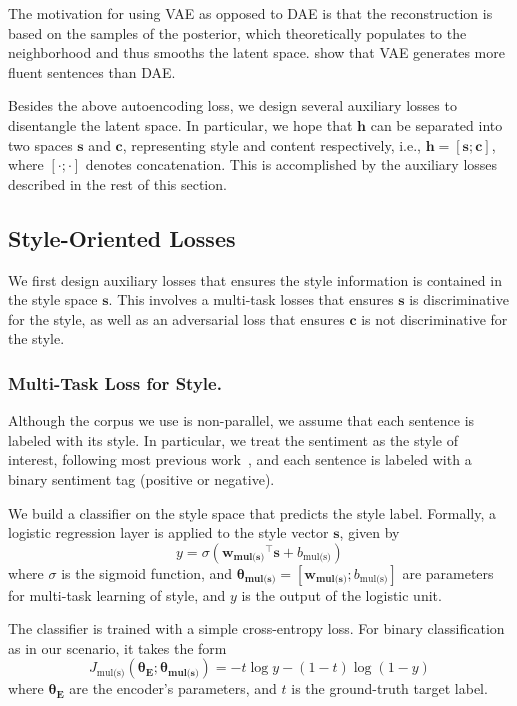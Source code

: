 \documentclass[letterpaper]{article} %
\newcommand{\loss}[1]{J_{\text{#1}}}
\newcommand{\nnweight}[1]{\bm{\theta_{\text{#1}}}}
\newcommand{\weight}[1]{\bm{w_{\text{#1}}}}
\newcommand{\bias}[1]{b_{\text{#1}}}
\newcommand{\citeay}[1]{\citeauthor{#1} \shortcite{#1}}
\begin{document}
The motivation for using VAE as opposed to DAE is  that the reconstruction is based on the samples of the posterior, which theoretically populates to the neighborhood and thus smooths the latent space. \citeay{bowman2016generating} show that VAE generates more fluent sentences than DAE.

Besides the above autoencoding loss, we design several auxiliary losses to disentangle the latent space. In particular, we hope that $\bm h$ can be separated into two spaces $\bm s$ and $\bm c$, representing style and content respectively, i.e., $\bm h = [\bm s ; \bm c]$, where $[\cdot;\cdot]$ denotes concatenation.
This is accomplished by the auxiliary losses described in the rest of this section.


\subsection{Style-Oriented Losses}

We first design auxiliary losses that ensures the style information is contained in the style space $\bm s$. This involves a multi-task losses that ensures $\bm s$ is discriminative for the style, as well as an adversarial loss that ensures $\bm c$ is not discriminative for the style.

\subsubsection{Multi-Task Loss for Style.} \label{ssec:multitask-style-objective}
Although the corpus we use is non-parallel, we assume that each sentence is labeled with its style. In particular, we treat the sentiment as the style of interest, following most previous work~\cite{hu2017toward,shen2017style,fu2017style}, and each sentence is labeled with a binary sentiment tag (positive or negative).

We build a classifier on the style space that predicts the style label. Formally, a logistic regression layer is applied to the style vector $\bm s$, given by
\begin{equation} \label{eqn:class-pred}
	y = \sigma({\weight{mul(s)}}^\top \bm s + \bias{mul(s)})
\end{equation}
where $\sigma$ is the sigmoid function, and $\nnweight{mul(s)}=[\weight{mul(s)}; \bias{mul(s)}]$ are parameters for multi-task learning of style, and $y$ is the output of the logistic unit.

The classifier is trained with a simple cross-entropy loss. For binary classification as in our scenario, it takes the form
\begin{equation} \label{eqn:style-multi-task-loss}
	\loss{mul(s)}(\nnweight{E};\nnweight{mul(s)}) =
	- t \log y - (1-t)\log (1-y)
\end{equation}
where $\nnweight{E}$ are the encoder's parameters, and $t$ is the ground-truth target label.
\end{document}
